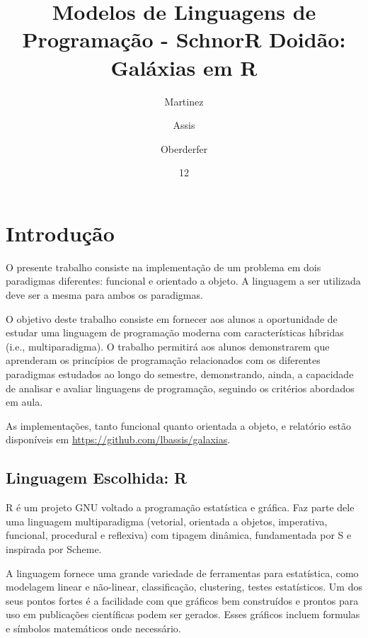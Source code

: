 \documentclass[rel_mlp]{iiufrgs}
\title{Modelos de Linguagens de Programação - SchnorR Doidão: Galáxias em R}
\author{Martinez}{José Pedro}
\author{Assis}{Lucas}
\author{Oberderfer}{Réges}
\date{12}{2017}
\begin{document}
\maketitle


\tableofcontents








%
\chapter{Introdução}

O presente trabalho consiste na implementação de um problema em dois paradigmas diferentes: funcional e orientado a objeto. A linguagem a ser utilizada deve ser a mesma para ambos os paradigmas.

O objetivo deste trabalho consiste em fornecer aos alunos a oportunidade de estudar uma linguagem de programação moderna com características híbridas (i.e., multiparadigma). O trabalho permitirá aos alunos demonstrarem que aprenderam os princípios de programação relacionados com os diferentes paradigmas estudados ao longo do semestre, demonstrando, ainda, a capacidade de analisar e avaliar linguagens de programação, seguindo os critérios abordados em aula.

As implementações, tanto funcional quanto orientada a objeto, e relatório estão disponíveis em \url{https://github.com/lbassis/galaxias}.
\section{Linguagem Escolhida: R}
	R é um projeto GNU \cite{GNU} voltado a programação estatística e gráfica. Faz parte dele uma linguagem multiparadigma (vetorial, orientada a objetos, imperativa, funcional, procedural e reflexiva) com tipagem dinâmica, fundamentada por S e inspirada por Scheme.

	A linguagem fornece uma grande variedade de ferramentas para estatística, como modelagem linear e não-linear, classificação, clustering, testes estatísticos. Um dos seus pontos fortes é a facilidade com que gráficos bem construídos e prontos para uso em publicações científicas podem ser gerados. Esses gráficos incluem formulas e símbolos matemáticos onde necessário.
\end{document}
